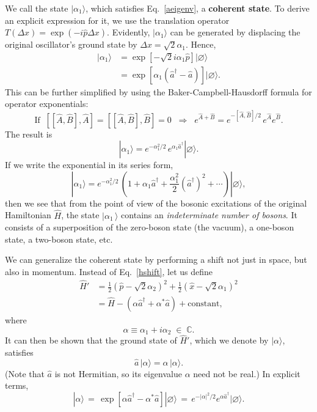 \documentclass[pra,12pt]{revtex4}
\begin{document}
We call the state $|\alpha_1\rangle$, which satisfies
Eq.~\eqref{aeigenv}, a \textbf{coherent state}.  To derive an explicit
expression for it, we use the translation operator $T(\Delta x) =
\exp(-i\hat{p}\Delta x)$.  Evidently, $|\alpha_1\rangle$ can be
generated by displacing the original oscillator's ground state by
$\Delta x = \sqrt{2}\alpha_1$.  Hence,
\begin{align}
  |\alpha_1\rangle &= \exp\left[-\sqrt{2}i\alpha_1\hat{p}\right] |\varnothing\rangle  \\
  &= \exp\left[\alpha_1\left(\hat{a}^\dagger - \hat{a}\right)\right] |\varnothing\rangle.
\end{align}
This can be further simplified by using the Baker-Campbell-Hausdorff
formula for operator exponentials:
\begin{equation}
  \mathrm{If} \;\; [[\hat{A},\hat{B}],\hat{A}] = [[\hat{A},\hat{B}],\hat{B}] = 0
  \;\;\Rightarrow \;\; e^{\hat{A}+\hat{B}}
  = e^{-[\hat{A},\hat{B}]/2}\, e^{\hat{A}} e^{\hat{B}}.
\end{equation}
The result is
\begin{equation}
  |\alpha_1\rangle = e^{-\alpha_1^2/2} \, e^{\alpha_1 \hat{a}^\dagger} |\varnothing\rangle.
\end{equation}
If we write the exponential in its series form,
\begin{equation}
  |\alpha_1\rangle = e^{-\alpha_1^2/2} \, \left(1 + \alpha_1 \hat{a}^\dagger
  + \frac{\alpha_1^2}{2} \left(\hat{a}^\dagger\right)^2 + \cdots\right)
 |\varnothing\rangle,
\end{equation}
then we see that from the point of view of the bosonic excitations of
the original Hamiltonian $\hat{H}$, the state $|\alpha_1\,\rangle$
contains an \textit{indeterminate number of bosons}.  It consists of a
superposition of the zero-boson state (the vacuum), a one-boson state,
a two-boson state, etc.

We can generalize the coherent state by performing a shift not just in
space, but also in momentum.  Instead of Eq.~\eqref{hshift}, let us
define
\begin{align}
  \hat{H}' &= \frac{1}{2}\left(\hat{p} - \sqrt{2}\alpha_2\right)^2
  + \frac{1}{2}\left(\hat{x} - \sqrt{2}\alpha_1\right)^2 \\
  &= \hat{H} - \left(\alpha \hat{a}^\dagger + \alpha^*\hat{a}\right)
  + \textrm{constant},
\end{align}
where
\begin{equation}
  \alpha \equiv \alpha_1 + i \alpha_2 \;\in \;\mathbb{C}.
\end{equation}
It can then be shown that the ground state of $\hat{H}'$, which we
denote by $|\alpha\rangle$, satisfies
\begin{equation}
  \hat{a} \, |\alpha\rangle = \alpha \,|\alpha\rangle.
\end{equation}
(Note that $\hat{a}$ is not Hermitian, so its eigenvalue $\alpha$ need
not be real.)  In explicit terms,
\begin{equation}
  |\alpha\rangle
  \,=\, \exp\left[\alpha\hat{a}^\dagger - \alpha^*\hat{a}\right] |\varnothing\rangle
  \,=\, e^{-|\alpha|^2/2} e^{\alpha\hat{a}^\dagger} |\varnothing\rangle.
  \label{alphaexp}
\end{equation}
\end{document}
